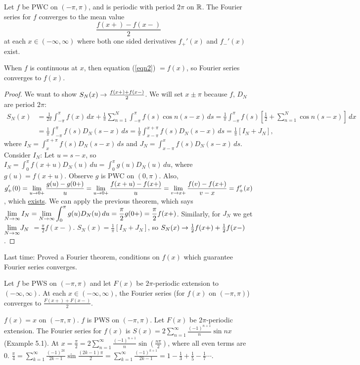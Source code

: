 \documentclass[]{article}
\begin{document}
\begin{theorem}
	Let $f$ be PWC on $(-\pi,\pi)$, and is periodic with period $2\pi$ on $\mathbb{R}$. The Fourier series for $f$ converges to the mean value \begin{equation}\frac{f(x+)-f(x-)}{2}\label{eqn2}\end{equation} at each $x\in(-\infty,\infty)$ where both one sided derivatives $f_+'(x)$ and $f_-'(x)$ exist.
\end{theorem}
\begin{note}
	When $f$ is continuous at $x$, then equation (\ref{eqn2}) $= f(x)$, so Fourier series converges to $f(x)$.
\end{note}
\begin{proof}
	We want to show $S_N(x) \rightarrow \frac{f(x+) + f(x-)}{2}$. We will set $x\pm\pi $ because $f$, $D_N$ are period $2\pi$: \begin{align*} S_N(x) &= \frac{1}{2\pi} \int_{-\pi}^\pi f(x) \, dx + \frac{1}{\pi} \sum_{n=1}^N \int_{-\pi}^\pi f(s) \cos{n(s-x)}\, ds = \frac{1}{\pi} \int_{-\pi}^\pi f(s) \left[ \frac{1}{2} + \sum_{n=1}^N \cos{n(s-x)} \right] \, dx \\ &= \frac{1}{\pi}\int_{-\pi}^\pi f(s) D_N(s-x) \, ds = \frac{1}{\pi} \int_{x-\pi}^{x+\pi} f(s) D_N(s-x) \, ds = \frac{1}{\pi} [I_N + J_N ], \end{align*} where $I_N = \int_x^{x+\pi} f(s) D_N(s-x)\, ds$ and $J_N = \int_{x-\pi}^x f(s) D_N(s-x) \, ds$. Consider $I_N$: Let $u=s-x$, so $\displaystyle I_N = \int_0^\pi f(x+u) D_N(u)\, du = \int_0^\pi g(u) D_N(u)\, du$, where $g(u) = f(x+u)$.
	Observe $g$ is PWC on $(0,\pi)$. Also, $\displaystyle g_+'(0) = \lim_{u\rightarrow0+} \frac{g(u)-g(0+)}{u} = \lim_{u\rightarrow0+} \frac{f(x+u)-f(x+)}{u} = \lim_{v\rightarrow x+} \frac{f(v) - f(x+)}{v-x} = f_+'(x)$, which \underline{exists}. We can apply the previous theorem, which says $\displaystyle \lim_{N\rightarrow\infty} I_N = \lim_{N\rightarrow\infty} \int_0^\pi g(u) D_N(u) \, du = \frac{\pi}{2} g(0+) = \frac{\pi}{2} f(x+)$. Similarly, for $J_N$ we get $\displaystyle{\lim_{N\rightarrow\infty}} J_N $ $= \frac{\pi}{2} f(x-)$. $S_N(x) = \frac{1}{\pi} [I_N + J_N]$, so $S_N(x) \rightarrow \frac{1}{2} f(x+) + \frac{1}{2} f(x-)$.
\end{proof}

Last time: Proved a Fourier theorem, conditions on $f(x)$ which guarantee Fourier series converges.
\begin{corollary}
	Let $f$ be PWS on $(-\pi,\pi)$ and let $F(x)$ be $2\pi$-periodic extension to $(-\infty,\infty)$. At each $x\in(-\infty,\infty)$, the Fourier series (for $f(x)$ on $(-\pi,\pi)$) converges to $\frac{F(x+)+F(x-)}{2}$.
\end{corollary}
\begin{example}
	$f(x)=x$ on $(-\pi,\pi)$. $f$ is PWS on $(-\pi,\pi)$. Let $F(x)$ be $2\pi$-periodic extension.
	The Fourier series for $f(x)$ is $S(x) = 2\sum_{n=1}^\infty \frac{(-1)^{n+1}}{n}\sin{nx}$ (Example 5.1).
	At $x = \frac{\pi}{2} = 2\sum_{n=1}^{\infty} \frac{(-1)^{n+1}}{n}\sin{\left(\frac{n\pi}{2}\right)}$, where all even terms are 0. $\frac{\pi}{4} = \sum_{k=1}^\infty \frac{(-1)^{2k}}{2k-1} \sin{\frac{(2k-1)\pi}{2}} = \sum_{k=1}^\infty \frac{(-1)^{k+1}}{2k-1} = 1-\frac{1}{3} + \frac{1}{5} - \frac{1}{7}\cdots$.
\end{example}
\end{document}
